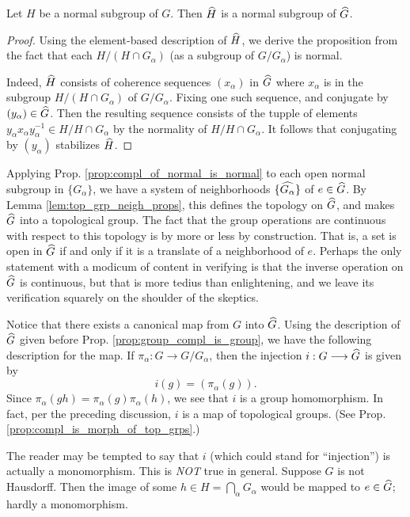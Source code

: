 \begin{prop}\label{prop:compl_of_normal_is_normal}
Let $H$ be a normal subgroup of $G$. Then $\widehat{H}$ is a 
normal subgroup of $\widehat{G}$.
\end{prop}
\begin{proof}
Using the element-based description of $\widehat{H}$, we derive
the proposition from the fact that each $H/(H \cap G_\alpha)$ (as
a subgroup of $G/G_\alpha$) is normal.

Indeed, $\widehat{H}$ consists of coherence sequences 
$(x_\alpha)$ in $\widehat{G}$ where $x_\alpha$ is in the subgroup 
$H/(H \cap G_\alpha)$ of $G/G_\alpha$. Fixing one such sequence, and
conjugate by $(y_\alpha) \in \widehat{G}$. Then the resulting 
sequence consists of the tupple of elements $y_\alpha x_\alpha 
y_\alpha^{-1} \in H/H \cap G_\alpha$ by the normality of $H/H \cap 
G_\alpha$. It follows that conjugating by $(y_\alpha)$ stabilizes
$\widehat{H}$.
\end{proof}

Applying Prop. \ref{prop:compl_of_normal_is_normal} to each open
normal subgroup in $\{G_\alpha\}$, we have a system of 
neighborhoods $\{\widehat{G_\alpha}\}$ of $e \in \widehat{G}$.
By Lemma \ref{lem:top_grp_neigh_props}, this defines the topology 
on $\widehat{G}$, and makes $\widehat{G}$ into a topological 
group. The fact that the group operations are continuous with 
respect to this topology is by more or less by construction. That 
is, a set is open in $\widehat{G}$ if and only if it is a 
translate of a neighborhood of $e$. Perhaps the only statement
with a modicum of content in verifying is that the inverse 
operation on $\widehat{G}$ is continuous, but that is more tedius 
than enlightening, and we leave its verification squarely on the
shoulder of the skeptics.

Notice that there exists a canonical map from $G$ into 
$\widehat{G}$. Using the description of $\widehat{G}$ given before
Prop. \ref{prop:group_compl_is_group}, we have the following 
description for the map. If $\pi_\alpha: G \to G/G_\alpha$, then
the injection $i: G \longrightarrow \widehat{G}$ is given by
\[
i(g) = (\pi_\alpha(g)).
\]
Since $\pi_\alpha(gh) = \pi_\alpha(g)\pi_\alpha(h)$, we see that
$i$ is a group homomorphism. In fact, per the preceding discussion,
$i$ is a map of topological groups. (See Prop.
\ref{prop:compl_is_morph_of_top_grps}.)

\begin{caution}
The reader may be tempted to say that $i$ (which could stand for 
``injection'') is actually a monomorphism. This is \emph{NOT} true 
in general. Suppose $G$ is not Hausdorff. Then the image of some 
$h \in H = \bigcap_\alpha G_\alpha$ would be mapped to $e \in 
\widehat{G}$; hardly a monomorphism. 
\end{caution}

